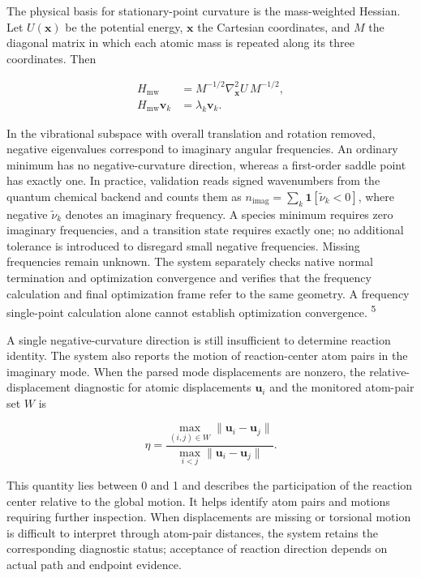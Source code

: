 The physical basis for stationary-point curvature is the mass-weighted Hessian. Let $U(\mathbf x)$ be the potential energy, $\mathbf x$ the Cartesian coordinates, and $M$ the diagonal matrix in which each atomic mass is repeated along its three coordinates. Then

\begin{equation}\label{eq:methods-10}
\begin{aligned}
H_{\mathrm{mw}}&=M^{-1/2}\nabla_{\mathbf x}^{2}U\,M^{-1/2},\\
H_{\mathrm{mw}}\mathbf v_k&=\lambda_k\mathbf v_k.
\end{aligned}
\end{equation}

In the vibrational subspace with overall translation and rotation removed, negative eigenvalues correspond to imaginary angular frequencies. An ordinary minimum has no negative-curvature direction, whereas a first-order saddle point has exactly one. In practice, validation reads signed wavenumbers from the quantum chemical backend and counts them as $n_{\mathrm{imag}}=\sum_k\mathbf 1[\tilde\nu_k<0]$, where negative $\tilde\nu_k$ denotes an imaginary frequency. A species minimum requires zero imaginary frequencies, and a transition state requires exactly one; no additional tolerance is introduced to disregard small negative frequencies. Missing frequencies remain unknown. The system separately checks native normal termination and optimization convergence and verifies that the frequency calculation and final optimization frame refer to the same geometry. A frequency single-point calculation alone cannot establish optimization convergence. \textsuperscript{5}

A single negative-curvature direction is still insufficient to determine reaction identity. The system also reports the motion of reaction-center atom pairs in the imaginary mode. When the parsed mode displacements are nonzero, the relative-displacement diagnostic for atomic displacements $\mathbf u_i$ and the monitored atom-pair set $W$ is

\begin{equation}\label{eq:methods-11}
\eta=\frac{\max_{(i,j)\in W}\|\mathbf u_i-\mathbf u_j\|}
{\max_{i<j}\|\mathbf u_i-\mathbf u_j\|}.
\end{equation}

This quantity lies between 0 and 1 and describes the participation of the reaction center relative to the global motion. It helps identify atom pairs and motions requiring further inspection. When displacements are missing or torsional motion is difficult to interpret through atom-pair distances, the system retains the corresponding diagnostic status; acceptance of reaction direction depends on actual path and endpoint evidence.


